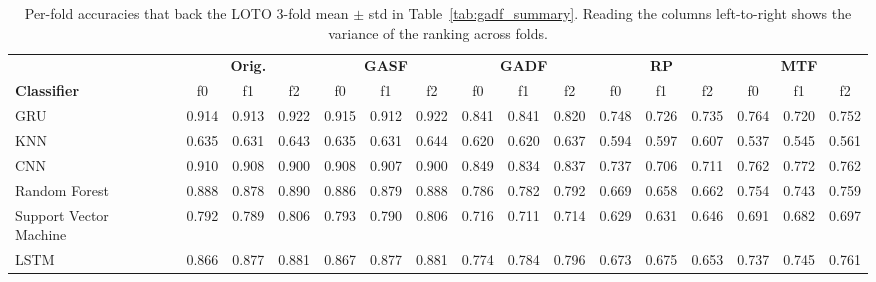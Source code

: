 \begin{table}[H]
\centering
\caption{Per-fold accuracies that back the LOTO 3-fold mean $\pm$ std in Table~\ref{tab:gadf_summary}. Reading the columns left-to-right shows the variance of the ranking across folds.}
\label{tab:gadf_summary_perfold}
\setlength{\tabcolsep}{3pt}
\footnotesize
\begin{tabular}{ll|ccc|ccc|ccc|ccc|ccc}
\toprule
 & & \multicolumn{3}{c|}{\textbf{Orig.}} & \multicolumn{3}{c|}{\textbf{GASF}} & \multicolumn{3}{c|}{\textbf{GADF}} & \multicolumn{3}{c|}{\textbf{RP}} & \multicolumn{3}{c}{\textbf{MTF}} \\
\textbf{Classifier} & & f0 & f1 & f2 & f0 & f1 & f2 & f0 & f1 & f2 & f0 & f1 & f2 & f0 & f1 & f2 \\
\midrule
GRU &  & 0.914 & 0.913 & 0.922 & 0.915 & 0.912 & 0.922 & 0.841 & 0.841 & 0.820 & 0.748 & 0.726 & 0.735 & 0.764 & 0.720 & 0.752 \\
KNN &  & 0.635 & 0.631 & 0.643 & 0.635 & 0.631 & 0.644 & 0.620 & 0.620 & 0.637 & 0.594 & 0.597 & 0.607 & 0.537 & 0.545 & 0.561 \\
CNN &  & 0.910 & 0.908 & 0.900 & 0.908 & 0.907 & 0.900 & 0.849 & 0.834 & 0.837 & 0.737 & 0.706 & 0.711 & 0.762 & 0.772 & 0.762 \\
Random Forest &  & 0.888 & 0.878 & 0.890 & 0.886 & 0.879 & 0.888 & 0.786 & 0.782 & 0.792 & 0.669 & 0.658 & 0.662 & 0.754 & 0.743 & 0.759 \\
Support Vector Machine &  & 0.792 & 0.789 & 0.806 & 0.793 & 0.790 & 0.806 & 0.716 & 0.711 & 0.714 & 0.629 & 0.631 & 0.646 & 0.691 & 0.682 & 0.697 \\
LSTM &  & 0.866 & 0.877 & 0.881 & 0.867 & 0.877 & 0.881 & 0.774 & 0.784 & 0.796 & 0.673 & 0.675 & 0.653 & 0.737 & 0.745 & 0.761 \\
\bottomrule
\end{tabular}
\end{table}


